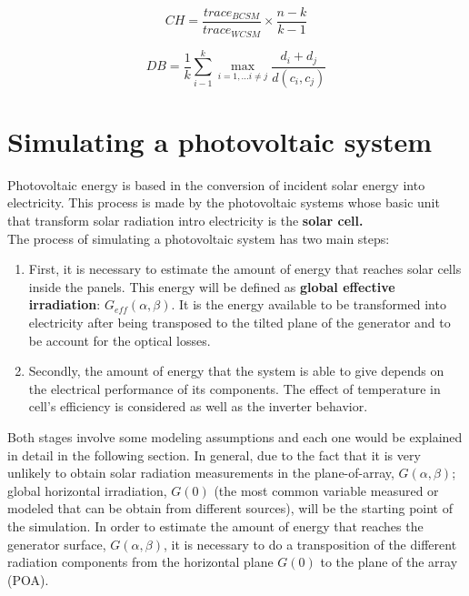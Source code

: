 \begin{equation}\label{eq:calinski}
    CH =\frac{trace_{BCSM}}{trace_{WCSM}}\times\frac{n-k}{k-1}
\end{equation}

\begin{equation}\label{eq:davies}
    DB =\frac{1}{k}\sum_{i-1}^{k}\max_{i=1,...i\neq{j}}{\frac{d_{i}+d_{j}}{d(c_i,c_j)}}
\end{equation}

\section{Simulating a photovoltaic system}

Photovoltaic energy is based in the conversion of incident solar energy into electricity. This process is made by the photovoltaic systems whose basic unit that transform solar radiation intro electricity is the \textbf{solar cell.}\\

The process of simulating a photovoltaic system has two main steps:

\begin{enumerate}
\item First, it is necessary to estimate the amount of energy that reaches solar cells inside the panels. This energy will be defined as \textbf{global effective irradiation}: $G_{eff}(\alpha, \beta)$. It is the energy available to be transformed into electricity after being transposed to the tilted plane of the generator and to be account for the optical losses.
  \item Secondly, the amount of energy that the system is able to give depends on the electrical performance of its components. The effect of temperature in cell's efficiency is considered as well as the inverter behavior.
  \end{enumerate}
  
Both stages involve some modeling assumptions and each one would be explained in detail in the following section. In general, due to the fact that it is very unlikely to obtain solar radiation measurements in the plane-of-array, $G(\alpha, \beta)$; global horizontal irradiation, $G(0)$ (the most common variable measured or modeled that can be obtain from different sources), will be the starting point of the simulation. In order to estimate the amount of energy that reaches the generator surface, $G(\alpha, \beta)$, it is necessary to do a transposition of the different radiation components from the horizontal plane $G(0)$ to the plane of the array (POA).

